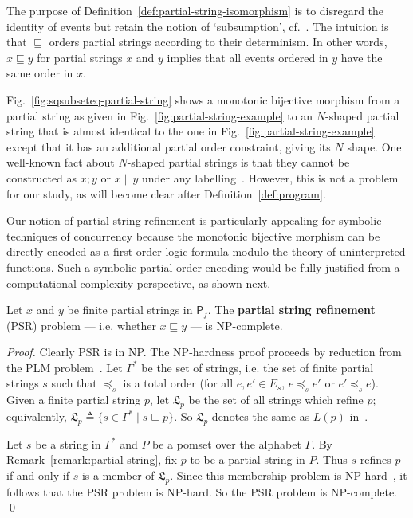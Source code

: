 \documentclass{llncs}
\newcommand{\set}[1]{\mbox{$\{ #1 \}$}}
\newcommand{\alt}{\mathrel{|}}
\newcommand{\deq}{\triangleq}
\newcommand{\sP}{\mathsf{P}}
\newcommand{\mfrL}{\mathfrak{L}}
\newcommand{\defn}[1]{\textbf{#1}}
\begin{document}
The purpose of Definition~\ref{def:partial-string-isomorphism} is to disregard the identity of events but retain the notion of `subsumption', cf.~\cite{G1988}. The intuition is that $\sqsubseteq$ orders partial strings according to their determinism. In other words, $x \sqsubseteq y$ for partial strings $x$ and $y$ implies that all events ordered in $y$ have the same order in $x$.

\begin{example}
\label{example:sqsubseteq-partial-string}
Fig.~\ref{fig:sqsubseteq-partial-string} shows a monotonic bijective morphism from a partial string as given in Fig.~\ref{fig:partial-string-example} to an $N$-shaped partial string that is almost identical to the one in Fig.~\ref{fig:partial-string-example} except that it has an additional partial order constraint, giving its $N$ shape. One well-known fact about $N$-shaped partial strings is that they cannot be constructed as $x ; y$ or $x \parallel y$ under any labelling~\cite{P1986}. However, this is not a problem for our study, as will become clear after Definition~\ref{def:program}.
\end{example}

Our notion of partial string refinement is particularly appealing for symbolic techniques of concurrency because the monotonic bijective morphism can be directly encoded as a first-order logic formula modulo the theory of uninterpreted functions. Such a symbolic partial order encoding would be fully justified from a computational complexity perspective, as shown next.

\begin{proposition}
\label{proposition:psr-NP-complete}
Let $x$ and $y$ be finite partial strings in $\sP_f$. The \defn{partial string refinement} (PSR) problem --- i.e. whether $x \sqsubseteq y$ --- is NP-complete.
\end{proposition}
\begin{proof}
Clearly \textsc{PSR} is in NP. The NP-hardness proof proceeds by reduction from the PLM problem~\cite{FKL1993}. Let $\Gamma^\ast$ be the set of strings, i.e. the set of finite partial strings $s$ such that $\preceq_s$ is a total order (for all $e, e' \in E_s$, $e \preceq_s e'$ or $e' \preceq_s e$). Given a finite partial string $p$, let $\mfrL_p$ be the set of all strings which refine $p$; equivalently, $\mfrL_p \deq \set{s \in \Gamma^\ast \alt s \sqsubseteq p}$. So $\mfrL_p$ denotes the same as $L(p)$ in~\cite[Definition 2.2]{FKL1993}.

Let $s$ be a string in $\Gamma^\ast$ and $P$ be a pomset over the alphabet $\Gamma$. By Remark~\ref{remark:partial-string}, fix $p$ to be a partial string in $P$. Thus $s$ refines $p$ if and only if $s$ is a member of $\mfrL_p$. Since this membership problem is NP-hard~\cite[Theorem 4.1]{FKL1993}, it follows that the \textsc{PSR} problem is NP-hard. So the \textsc{PSR} problem is NP-complete. \qed
\end{proof}
\end{document}
